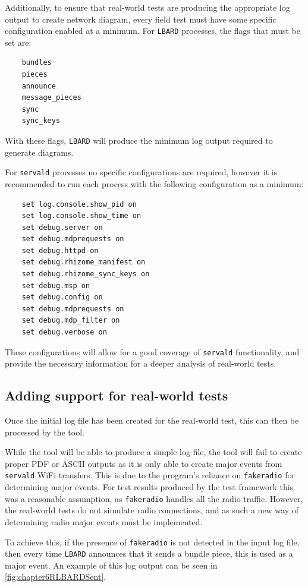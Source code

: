 Additionally, to ensure that real-world tests are producing the appropriate log output to create network diagram, every field test must have some specific configuration enabled at a minimum.
For \texttt{LBARD} processes, the flags that must be set are:
\begin{lstlisting}
    bundles
    pieces
    announce
    message_pieces
    sync
    sync_keys
    \end{lstlisting}

With these flags, \texttt{LBARD} will produce the minimum log output required to generate diagrams. 

For \texttt{servald} processes no specific configurations are required, however it is recommended to run each process with the following configuration as a minimum:
\begin{lstlisting}
    set log.console.show_pid on 
    set log.console.show_time on 
    set debug.server on 
    set debug.mdprequests on 
    set debug.httpd on 
    set debug.rhizome_manifest on
    set debug.rhizome_sync_keys on
    set debug.msp on
    set debug.config on
    set debug.mdprequests on
    set debug.mdp_filter on
    set debug.verbose on
\end{lstlisting}
These configurations will allow for a good coverage of \texttt{servald} functionality, and provide the necessary information for a deeper analysis of real-world tests.


\subsection{Adding support for real-world tests}
Once the initial log file has been created for the real-world test, this can then be processed by the tool.

While the tool will be able to produce a simple log file, the tool will fail to create proper PDF or ASCII outputs as it is only able to create major events from \texttt{servald} WiFi transfers.
This is due to the program's reliance on \texttt{fakeradio} for determining major events.
For test results produced by the test framework this was a reasonable assumption, as \texttt{fakeradio} handles all the radio traffic.
However, the real-world tests do not simulate radio connections, and as such a new way of determining radio major events must be implemented.

To achieve this, if the presence of \texttt{fakeradio} is not detected in the input log file, then every time \texttt{LBARD} announces that it sends a bundle piece, this is used as a major event.
An example of this log output can be seen in \figurename{ \ref{fig:chapter6RLBARDSent}}.

